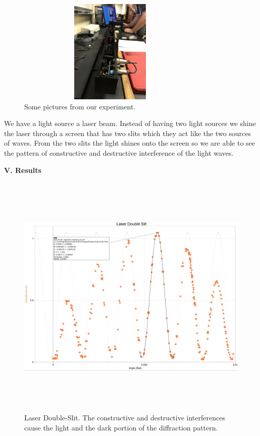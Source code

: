 \documentclass[fleqn]{article}
\begin{document}
\begin{figure}[h!]
    \includegraphics[height=5cm, width=9cm]{2 (6).jpg}
    \caption{
      Some pictures from our experiment.
    }
  \end{figure}

  We have a light source a laser beam. Instead of having two light sources we shine the laser through a
  screen that has two slits which they act like the two sources of waves. From the two slits the light
  shines onto the screen so we are able to see the pattern of constructive and destructive interference 
  of the light waves.
  
  \vspace{20px}


  \textbf{V. Results}

  \vspace{10px}

    
  \begin{figure}[h!]
    \includegraphics[height=12cm, width=18cm]{Fig1.JPG}
    \caption{
      Laser Double-Slit. The constructive and destructive interferences cause the light and the dark portion of the diffraction
      pattern.
    }
  \end{figure}
\end{document}

